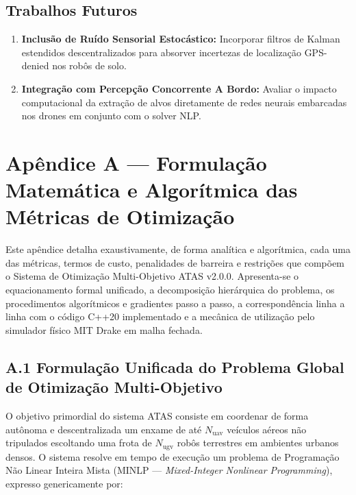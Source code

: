 \documentclass[
  brazilian,
  a4paper]{article}
\providecommand{\tightlist}{%
  \setlength{\itemsep}{0pt}\setlength{\parskip}{0pt}}
\begin{document}
\subsection{Trabalhos Futuros}\label{trabalhos-futuros}

\begin{enumerate}
\def\labelenumi{\arabic{enumi}.}
\tightlist
\item
  \textbf{Inclusão de Ruído Sensorial Estocástico:} Incorporar filtros
  de Kalman estendidos descentralizados para absorver incertezas de
  localização GPS-denied nos robôs de solo.
\item
  \textbf{Integração com Percepção Concorrente A Bordo:} Avaliar o
  impacto computacional da extração de alvos diretamente de redes
  neurais embarcadas nos drones em conjunto com o solver NLP.
\end{enumerate}

\section{Apêndice A --- Formulação Matemática e Algorítmica das Métricas
de
Otimização}\label{apuxeandice-a-formulauxe7uxe3o-matemuxe1tica-e-algoruxedtmica-das-muxe9tricas-de-otimizauxe7uxe3o}

Este apêndice detalha exaustivamente, de forma analítica e algorítmica,
cada uma das métricas, termos de custo, penalidades de barreira e
restrições que compõem o Sistema de Otimização Multi-Objetivo ATAS
v2.0.0. Apresenta-se o equacionamento formal unificado, a decomposição
hierárquica do problema, os procedimentos algorítmicos e gradientes
passo a passo, a correspondência linha a linha com o código C++20
implementado e a mecânica de utilização pelo simulador físico MIT Drake
em malha fechada.

\subsection{A.1 Formulação Unificada do Problema Global de Otimização
Multi-Objetivo}\label{a.1-formulauxe7uxe3o-unificada-do-problema-global-de-otimizauxe7uxe3o-multi-objetivo}

O objetivo primordial do sistema ATAS consiste em coordenar de forma
autônoma e descentralizada um enxame de até \(N_{\text{uav}}\) veículos
aéreos não tripulados escoltando uma frota de \(N_{\text{ugv}}\) robôs
terrestres em ambientes urbanos densos. O sistema resolve em tempo de
execução um problema de Programação Não Linear Inteira Mista (MINLP ---
\emph{Mixed-Integer Nonlinear Programming}), expresso genericamente por:
\end{document}
